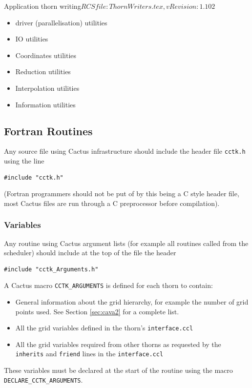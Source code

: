 \begin{cactuspart}{2}{Application thorn writing}{$RCSfile: ThornWriters.tex,v $}{$Revision: 1.102 $}
\begin{Lentry}
\begin{itemize}
  \item{} driver (parallelisation) utilities
  \item{} IO utilities
  \item{} Coordinates utilities
  \item{} Reduction utilities
  \item{} Interpolation utilities
  \item{} Information utilities
\end{itemize}
\end{Lentry}


\subsection{Fortran Routines}

Any source file using Cactus infrastructure should include
the header file {\tt cctk.h} using the line
\begin{verbatim}
#include "cctk.h"
\end{verbatim}
(Fortran programmers should not be put of by this being a C style
header file, most Cactus files are run through a C preprocessor
before compilation).

\subsubsection{Variables}

Any routine using Cactus argument lists (for example all
routines called from the scheduler) should include at the
top of the file the header
\begin{verbatim}
#include "cctk_Arguments.h"
\end{verbatim}

A Cactus macro {\tt CCTK\_ARGUMENTS} is defined for each thorn
to contain:
\begin{itemize}
\item General information about the grid hierarchy, for example
      the number of grid points used. See Section \ref{sec:cava2} for a
      complete list.
\item All the grid variables defined in the thorn's {\tt interface.ccl}
\item All the grid variables required from other thorns as requested by
      the {\tt inherits} and {\tt friend} lines in the {\tt interface.ccl}
\end{itemize}
These variables must be declared at the start of the routine using
the macro {\tt DECLARE\_CCTK\_ARGUMENTS}.


\end{cactuspart}
